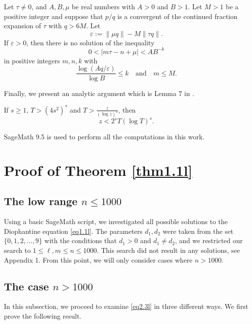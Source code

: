 \begin{lemma}\label{dujl}
	Let \( \tau \neq 0 \), and \( A, B, \mu \) be real numbers with \( A > 0 \) and \( B > 1 \). Let \( M > 1 \) be a positive integer and suppose that \( p/q \) is a convergent of the continued fraction expansion of \( \tau \) with \( q > 6M \). Let
	\[
	\varepsilon := \| \mu q \| - M \| \tau q \|.
	\]
	If \( \varepsilon > 0 \), then there is no solution of the inequality
	\[
	0 < |m\tau - n + \mu| < AB^{-k}
	\]
	in positive integers \( m, n, k \) with
	\[
	\frac{\log(Aq/\varepsilon)}{\log B} \leq k \quad \text{and} \quad m \leq M.
	\]
\end{lemma}


Finally, we present an analytic argument which is Lemma 7 in \cite{guz}. 

\begin{lemma}\label{guzl}
If $ s \geq 1 $, $T > (4s^2)^s$ and $T > \displaystyle \frac{z}{(\log z)^s}$, then $$z < 2^s T (\log T)^s.$$	
\end{lemma}

SageMath 9.5 is used to perform all the computations in this work.

\section{Proof of Theorem \ref{thm1.1l}}
\subsection{The low range $n\le 1000$}
Using a basic SageMath script, we investigated all possible solutions to the Diophantine equation \eqref{eq1.1l}. The parameters $d_1, d_2$ were taken from the set $\{0, 1, 2, \ldots, 9\}$ with the conditions that $d_1 > 0$ and $d_1 \neq d_2$, and we restricted our search to $1 \leq \ell, m \leq n \leq 1000$. This search did not result in any solutions, see Appendix 1. From this point, we will only consider cases where $n > 1000$.

\subsection{The case $n> 1000$}
In this subsection, we proceed to examine \eqref{eq2.3l} in three different ways. We first prove the following result.

